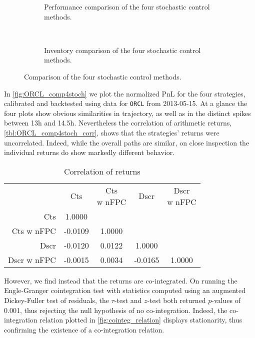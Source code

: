 \begin{figure}
  \centering
\begin{subfigure}{\linewidth}
  \setlength{} 
  \setlength\figurewidth{\linewidth}
  
  \caption{Performance comparison of the four stochastic control methods.}
  \label{fig:ORCL_comp4stoch}
\end{subfigure}\\
\vspace{1cm}
\begin{subfigure}{\linewidth}
  \centering
  \setlength{} 
  \setlength\figurewidth{\linewidth}
  
  \caption{Inventory comparison of the four stochastic control methods.}
  \label{fig:ORCL_comp4stoch_inv}
\end{subfigure}%
\caption{Comparison of the four stochastic control methods.}
\end{figure}
In \autoref{fig:ORCL_comp4stoch} we plot the normalized PnL for the four strategies, calibrated and backtested using data for \texttt{ORCL} from 2013-05-15. At a glance the four plots show obvious similarities in trajectory, as well as in the distinct spikes between 13h and 14.5h. Nevertheless the correlation of arithmetic returns, \autoref{tbl:ORCL_comp4stoch_corr}, shows that the strategies' returns were uncorrelated. Indeed, while the overall paths are similar, on close inspection the individual returns do show markedly different behavior.
\begin{table}[H]
\centering
{}
\begin{tabular}{@{} r *{4}{c} @{}}
\toprule
& Cts & \cellbreak{t}{c}{Cts \\ w nFPC} & Dscr & \cellbreak{t}{c}{Dscr \\ w nFPC} \\
\cmidrule{2-5}
Cts          &  1.0000  & & & \\
Cts w nFPC   & -0.0109  &  1.0000 &  & \\
Dscr         & -0.0120  &  0.0122 &   1.0000 &  \\
Dscr w nFPC  & -0.0015  &  0.0034 &  -0.0165 &   1.0000 \\
\bottomrule
\end{tabular}
\caption{Correlation of returns}
\label{tbl:ORCL_comp4stoch_corr}
\end{table}
However, we find instead that the returns are co-integrated. On running the Engle-Granger cointegration test with statistics computed using an augmented Dickey-Fuller test of residuals, the $\tau$-test and $z$-test both returned $p$-values of 0.001, thus rejecting the null hypothesis of no co-integration. Indeed, the co-integration relation plotted in \autoref{fig:cointeg_relation} displays stationarity, thus confirming the existence of a co-integration relation.
